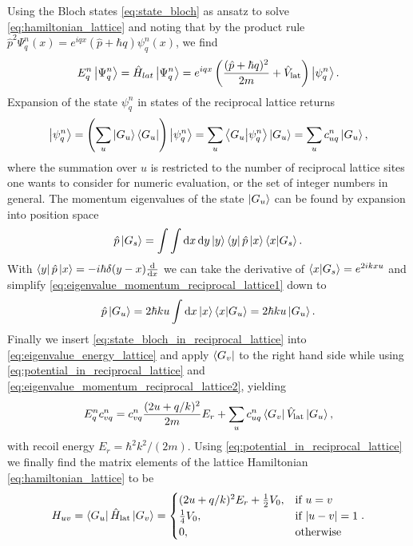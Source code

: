 Using the Bloch states \cref{eq:state_bloch} as ansatz to solve
\cref{eq:hamiltonian_lattice} and noting that by the product rule
$\hat{p}^2\Psi^n_q(x)=e^{iqx}(\hat{p}+\hbar q)\psi^n_q(x)$, we find
\begin{equation}
  E^n_q\ket{\Psi^n_{q}}
  =\hat{H}_{lat}\ket{\Psi^n_{q}}
  =e^{iqx}\left(\frac{(\hat{p}+\hbar q)^2}{2m}+\hat{V}_\text{lat}\right)\ket{\psi^n_{q}}
  \label{eq:eigenvalue_energy_lattice}.
\end{equation}
Expansion of the state $\psi^n_q$ in states of the reciprocal lattice returns
\begin{equation}
  \ket{\psi^n_q}
  =\left(\sum_u\ket{G_u}\bra{G_u}\right)\ket{\psi^n_q}
  =\sum_u \braket{G_u}{\psi^n_q}\ket{G_u}
  =\sum_u c^n_{uq}\ket{G_u}
  \label{eq:state_bloch_in_reciprocal_lattice},
\end{equation}
where the summation over $u$ is restricted to the number of reciprocal
lattice sites one wants to consider for numeric evaluation, or the set of
integer numbers in general. The momentum eigenvalues of the state $\ket{G_u}$
can be found by expansion into position space
\begin{equation}
  \hat{p}\ket{G_s}
  =\int\int\dd{x}\dd{y}\ket{y}\bra{y}\hat{p}\ket{x}\bra{x}\ket{G_s}
  \label{eq:eigenvalue_momentum_reciprocal_lattice1}.
\end{equation}
With $\bra{y}\hat{p}\ket{x}=-i\hbar\delta(y-x)\dv{x}$ we can take the
derivative of $\bra{x}\ket{G_s}=e^{2ikxu}$ and simplify
\cref{eq:eigenvalue_momentum_reciprocal_lattice1} down to
\begin{equation}
  \hat{p}\ket{G_u}
  =2\hbar ku\int\dd{x}\ket{x}\bra{x}\ket{G_u}
  =2\hbar ku\ket{G_u}
  \label{eq:eigenvalue_momentum_reciprocal_lattice2}.
\end{equation}
Finally we insert \cref{eq:state_bloch_in_reciprocal_lattice} into
\cref{eq:eigenvalue_energy_lattice} and apply $\bra{G_v}$ to the
right hand side while using \cref{eq:potential_in_reciprocal_lattice} and
\cref{eq:eigenvalue_momentum_reciprocal_lattice2}, yielding
\begin{equation}
  E^n_qc^n_{vq}
  =c^n_{vq}
  \frac{(2u+q/k)^2}{2m}E_r+
  \sum_u c^n_{uq}\bra{G_v}\hat{V}_\text{lat}\ket{G_u},
  \label{eq:eigenvalue_energy_lattice_explicit}
\end{equation}
with recoil energy $E_r=\hbar^2k^2/(2m)$. Using
\cref{eq:potential_in_reciprocal_lattice} we finally find the matrix elements
of the lattice Hamiltonian \cref{eq:hamiltonian_lattice} to be
\begin{equation}
  H_{uv}
  =\bra{G_u}\hat{H}_\text{lat}\ket{G_v}
  =\begin{cases}
    (2u+q/k)^2E_r+\frac{1}{2}V_0, & \text{if }u=v\\
    \frac{1}{4}V_0, & \text{if } \abs{u-v}=1\\
    0, & \text{otherwise}
  \end{cases}
  \label{eq:hamiltonian_lattice_elements}.
\end{equation}

